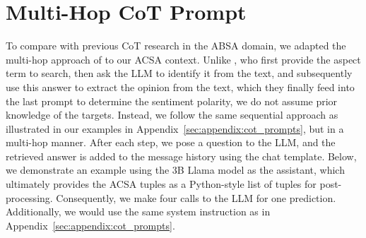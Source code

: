 \documentclass[11pt]{article}
\begin{document}
\section{Multi-Hop CoT Prompt}
\label{sec:appendix:multi_hop}
To compare with previous CoT research in the ABSA domain, we adapted the multi-hop approach of \citet{fei-etal-2023-reasoning,10499502} to our ACSA context. Unlike \citet{fei-etal-2023-reasoning}, who first provide the aspect term to search, then ask the LLM to identify it from the text, and subsequently use this answer to extract the opinion from the text, which they finally feed into the last prompt to determine the sentiment polarity, we do not assume prior knowledge of the targets. Instead, we follow the same sequential approach as illustrated in our examples in Appendix~\ref{sec:appendix:cot_prompts}, but in a multi-hop manner. After each step, we pose a question to the LLM, and the retrieved answer is added to the message history using the chat template. Below, we demonstrate an example using the 3B Llama model as the assistant, which ultimately provides the ACSA tuples as a Python-style list of tuples for post-processing. Consequently, we make four calls to the LLM for one prediction. Additionally, we would use the same system instruction as in Appendix~\ref{sec:appendix:cot_prompts}.
\end{document}
